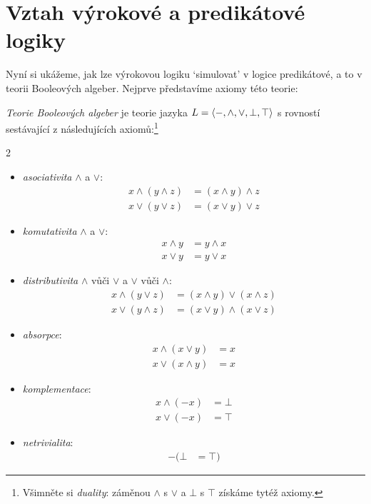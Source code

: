 \section{Vztah výrokové a predikátové logiky}
\label{section:relationship-propositional-predicate-logic}

Nyní si ukážeme, jak lze výrokovou logiku `simulovat' v logice predikátové, a to v teorii Booleových algeber. Nejprve představíme axiomy této teorie:

\begin{definition}
    \emph{Teorie Booleových algeber} je teorie jazyka $L=\langle -,{\land},{\lor},\bot,\top\rangle$ s rovností sestávající z následujících axiomů:\footnote{Všimněte si \emph{duality}: záměnou $\land$ s $\lor$ a $\bot$ s $\top$ získáme tytéž axiomy.}
    \begin{multicols}{2}
        \begin{itemize}
            \item \emph{asociativita} $\land$ a $\lor$:
            \begin{align*}
                x\land(y\land z) &=(x\land y)\land z\\
                x\lor(y\lor z) &=(x\lor y)\lor z
            \end{align*}
            \item \emph{komutativita} $\land$ a $\lor$:
            \begin{align*}
                x\land y &= y\land x\\
                x\lor y &= y\lor x
            \end{align*}
            \item \emph{distributivita} $\land$ vůči $\lor$ a $\lor$ vůči $\land$:
            \begin{align*}
                x\land(y\lor z) &= (x\land y)\lor (x\land z)\\
                x\lor(y\land z) &= (x\lor y)\land (x\lor z)
            \end{align*}
            \item \emph{absorpce}:
            \begin{align*}
                x\land(x\lor y) &= x\\
                x\lor(x\land y) &= x
            \end{align*}
            \item \emph{komplementace}:
            \begin{align*}
                x\land(-x) &= \bot \\
                x\lor(-x) &= \top
            \end{align*}
            \item \emph{netrivialita}:
            \begin{align*}
                -(\bot &= \top)
            \end{align*}

        \end{itemize}
    \end{multicols}
\end{definition}
    
